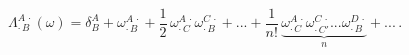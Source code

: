 \begin{equation}\label{Lam}
\Lambda^{A\,\cdot}_{\cdot\,B}(\omega)=
\delta^{A}_{B}
+\omega^{A\,\cdot}_{\cdot\,B}
+\frac{1}{2}\,\omega^{A\,\cdot}_{\cdot\,C}
\omega^{C\,\cdot}_{\cdot\,B}+...
+\frac{1}{n!}\,\underbrace{\omega^{A\,\cdot}_{\cdot\,C}
\omega^{C\,\cdot}_{\cdot\, C'}
...\omega^{D\,\cdot}_{\cdot\,B}}_{n}+...\,.
\end{equation}

